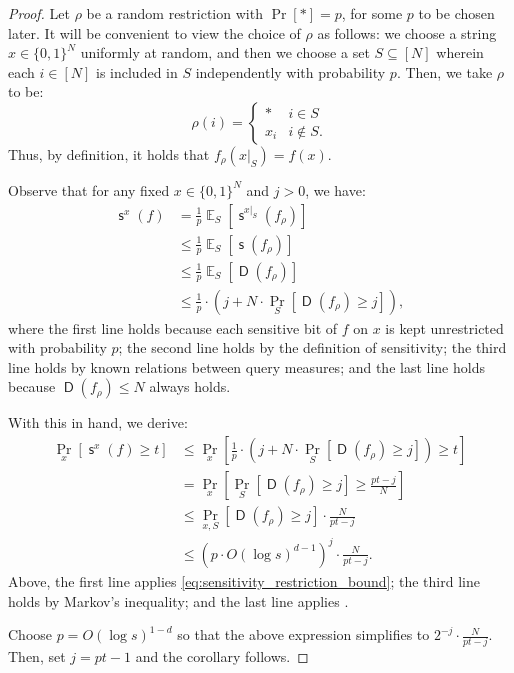 \documentclass[11pt]{article}%
\newcommand{\E}{\mathop{\mathbb{E}}}
\DeclareMathOperator{\D}{\mathsf{D}}
\DeclareMathOperator{\s}{\mathsf{s}}
\begin{document}
\begin{proof}
Let $\rho$ be a random restriction with $\Pr[*] = p$, for some $p$ to be chosen later. It will be convenient to view the choice of $\rho$ as follows: we choose a string $x \in \{0,1\}^N$ uniformly at random, and then we choose a set $S \subseteq [N]$ wherein each $i \in [N]$ is included in $S$ independently with probability $p$. Then, we take $\rho$ to be:
\[\rho(i) = \begin{cases} * & i \in S\\ x_i & i \not\in S. \end{cases}\]
Thus, by definition, it holds that $f_\rho(x|_S) = f(x)$.

Observe that for any fixed $x \in \{0,1\}^N$ and $j > 0$, we have:
\begin{align}
\s^x(f)
&=\frac{1}{p}\E_S\left[\s^{x|_S}(f_\rho) \right]\nonumber\\
&\le \frac{1}{p}\E_S\left[\s(f_\rho) \right]\nonumber\\
&\le \frac{1}{p}\E_S\left[\D(f_\rho) \right]\nonumber\\
&\le \frac{1}{p} \cdot \left(j + N \cdot \Pr_S\left[\D(f_\rho) \ge j\right] \right),\label{eq:sensitivity_restriction_bound}
\end{align}
where the first line holds because each sensitive bit of $f$ on $x$ is kept unrestricted with probability $p$; the second line holds by the definition of sensitivity; the third line holds by known relations between query measures; and the last line holds because $\D(f_\rho) \le N$ always holds.

With this in hand, we derive:
\begin{align*}
\Pr_x\left[\s^x(f) \ge t\right]
&\le \Pr_x\left[ \frac{1}{p} \cdot \left(j + N \cdot \Pr_S\left[\D(f_\rho) \ge j\right] \right) \ge t \right]\\
&= \Pr_x\left[\Pr_S\left[\D(f_\rho) \ge j\right] \ge \frac{pt - j}{N} \right]\\
&\le  \Pr_{x,S}\left[\D(f_\rho) \ge j\right] \cdot \frac{N}{pt - j}\\
&\le \left(p \cdot O\left(\log s\right)^{d-1}\right)^j \cdot \frac{N}{pt - j}.
\end{align*}
Above, the first line applies \eqref{eq:sensitivity_restriction_bound}; the third line holds by Markov's inequality; and the last line applies .

Choose $p = O\left(\log s\right)^{1-d}$ so that the above expression simplifies to $2^{-j} \cdot \frac{N}{pt - j}$. Then, set $j = pt - 1$ and the corollary follows.
\end{proof}
\end{document}
